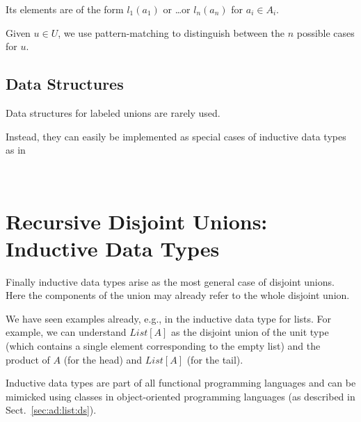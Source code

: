 Its elements are of the form $l_1(a_1)$ or \ldots or $l_n(a_n)$ for $a_i\in A_i$.

Given $u\in U$, we use pattern-matching to distinguish between the $n$ possible cases for $u$.

\subsection{Data Structures}

Data structures for labeled unions are rarely used.

Instead, they can easily be implemented as special cases of inductive data types as in
\begin{acode}
\\
\end{acode}


\section{Recursive Disjoint Unions: Inductive Data Types}

Finally inductive data types arise as the most general case of disjoint unions.
Here the components of the union may already refer to the whole disjoint union.

We have seen examples already, e.g., in the inductive data type for lists.
For example, we can understand $List[A]$ as the disjoint union of the unit type (which contains a single element corresponding to the empty list) and the product of $A$ (for the head) and $List[A]$ (for the tail).

Inductive data types are part of all functional programming languages and can be mimicked using classes in object-oriented programming languages (as described in Sect.~\ref{sec:ad:list:ds}).